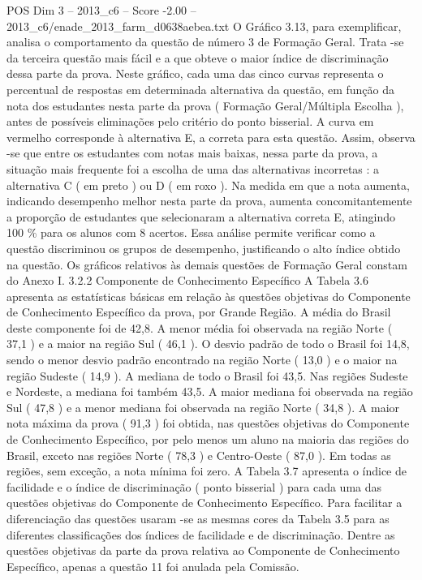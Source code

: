 \begin{textsample}{POS Dim 3 – 2013\_c6 – Score -2.00 – 2013\_c6/enade\_2013\_farm\_d0638aebea.txt}
O Gráfico 3.13, para exemplificar, analisa o comportamento da questão de número 3 de Formação Geral.
Trata -se da terceira questão mais fácil e a que obteve o maior índice de discriminação dessa parte da prova.
Neste gráfico, cada uma das cinco curvas representa o percentual de respostas em determinada alternativa da questão, em função da nota dos estudantes nesta parte da prova ( Formação Geral/Múltipla Escolha ), antes de possíveis eliminações pelo critério do ponto bisserial.
A curva em vermelho corresponde à alternativa E, a correta para esta questão.
Assim, observa -se que entre os estudantes com notas mais baixas, nessa parte da prova, a situação mais frequente foi a escolha de uma das alternativas incorretas : a alternativa C ( em preto ) ou D ( em roxo ).
Na medida em que a nota aumenta, indicando desempenho melhor nesta parte da prova, aumenta concomitantemente a proporção de estudantes que selecionaram a alternativa correta E, atingindo 100 \% para os alunos com 8 acertos.
Essa análise permite verificar como a questão discriminou os grupos de desempenho, justificando o alto índice obtido na questão.
Os gráficos relativos às demais questões de Formação Geral constam do Anexo I. 3.2.2 Componente de Conhecimento Específico A Tabela 3.6 apresenta as estatísticas básicas em relação às questões objetivas do Componente de Conhecimento Específico da prova, por Grande Região.
A média do Brasil deste componente foi de 42,8.
A menor média foi observada na região Norte ( 37,1 ) e a maior na região Sul ( 46,1 ).
O desvio padrão de todo o Brasil foi 14,8, sendo o menor desvio padrão encontrado na região Norte ( 13,0 ) e o maior na região Sudeste ( 14,9 ).
A mediana de todo o Brasil foi 43,5.
Nas regiões Sudeste e Nordeste, a mediana foi também 43,5.
A maior mediana foi observada na região Sul ( 47,8 ) e a menor mediana foi observada na região Norte ( 34,8 ).
A maior nota máxima da prova ( 91,3 ) foi obtida, nas questões objetivas do Componente de Conhecimento Específico, por pelo menos um aluno na maioria das regiões do Brasil, exceto nas regiões Norte ( 78,3 ) e Centro-Oeste ( 87,0 ).
Em todas as regiões, sem exceção, a nota mínima foi zero.
A Tabela 3.7 apresenta o índice de facilidade e o índice de discriminação ( ponto bisserial ) para cada uma das questões objetivas do Componente de Conhecimento Específico.
Para facilitar a diferenciação das questões usaram -se as mesmas cores da Tabela 3.5 para as diferentes classificações dos índices de facilidade e de discriminação.
Dentre as questões objetivas da parte da prova relativa ao Componente de Conhecimento Específico, apenas a questão 11 foi anulada pela Comissão.

\end{textsample}
